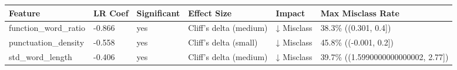 \begin{tabular}{llllll}
\toprule
Feature & LR Coef & Significant & Effect Size & Impact & Max Misclass Rate \\
\midrule
function\_word\_ratio & -0.866 & yes & Cliff's delta (medium) & ↓ Misclass & 38.3\% ((0.301, 0.4]) \\
punctuation\_density & -0.558 & yes & Cliff's delta (small) & ↓ Misclass & 45.8\% ((-0.001, 0.2]) \\
std\_word\_length & -0.406 & yes & Cliff's delta (medium) & ↓ Misclass & 39.7\% ((1.5990000000000002, 2.77]) \\
\bottomrule
\end{tabular}

